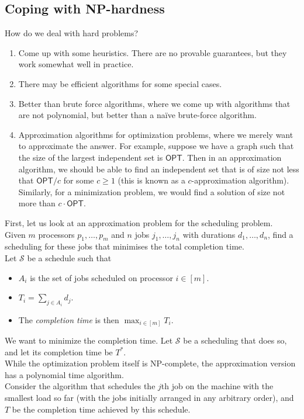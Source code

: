 \subsection{Coping with NP-hardness}

	How do we deal with hard problems?
	\begin{enumerate}
		\item Come up with some heuristics. There are no provable guarantees, but they work somewhat well in practice.
		\item There may be efficient algorithms for some special cases.
		\item Better than brute force algorithms, where we come up with algorithms that are not polynomial, but better than a na\"{i}ve brute-force algorithm.
		\item Approximation algorithms for optimization problems, where we merely want to approximate the answer. For example, suppose we have a graph such that the size of the largest independent set is $\mathsf{OPT}$. Then in an approximation algorithm, we should be able to find an independent set that is of size not less that $\mathsf{OPT}/c$ for some $c \geq 1$ (this is known as a $c$-approximation algorithm). Similarly, for a minimization problem, we would find a solution of size not more than $c\cdot\mathsf{OPT}$.
	\end{enumerate}
	
	First, let us look at an approximation problem for the scheduling problem.\\
	Given $m$ processors $p_1,\ldots,p_m$ and $n$ jobs $j_1,\ldots,j_n$ with durations $d_1,\ldots,d_n$, find a scheduling for these jobs that minimises the total completion time.\\
	Let $\mathcal{S}$ be a schedule such that
	\begin{itemize}
		\item $A_i$ is the set of jobs scheduled on processor $i\in[m]$.
		\item $T_i = \sum_{j \in A_i} d_j$.
		\item The \textit{completion time} is then $\max_{i \in [m]} T_i$.
	\end{itemize}
	We want to minimize the completion time. Let $\mathcal{S}$ be a scheduling that does so, and let its completion time be $T^*$.\\ 
	While the optimization problem itself is NP-complete, the approximation version has a polynomial time algorithm.\\
	Consider the algorithm that schedules the $j$th job on the machine with the smallest load so far (with the jobs initially arranged in any arbitrary order), and $T$ be the completion time achieved by this schedule.

